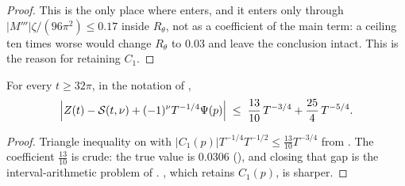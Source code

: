 \begin{proof}
This is the only place where  enters, and it enters only through
$\lvert M'''\rvert\zeta/(96\pi^{2})\le0.17$ inside $R_{\theta}$, not as a coefficient of the main
term: a ceiling ten times worse would change $R_{\theta}$ to $0.03$ and leave the conclusion
intact.  This is the reason for retaining $C_{1}$.
\end{proof}

\begin{corollary}
\label{cor:rsf_formula_drop}
\leanok
{}
For every $t\ge32\pi$, in the notation of ,
\[
  \Bigl\lvert Z(t)-\mathcal S(t,\nu)+(-1)^{\nu}T^{-1/4}\Psi(p)\Bigr\rvert
  \;\le\;\frac{13}{10}\,T^{-3/4}+\frac{25}4\,T^{-5/4}.
\]
\end{corollary}

\begin{proof}
\leanok
{}
Triangle inequality on  with
$\lvert C_{1}(p)\rvert T^{-1/4}T^{-1/2}\le\tfrac{13}{10}T^{-3/4}$ from .  The
coefficient $\tfrac{13}{10}$ is crude: the true value is $0.0306$
(), and closing that gap is the interval-arithmetic problem of
.  , which retains $C_{1}(p)$, is
sharper.
\end{proof}

